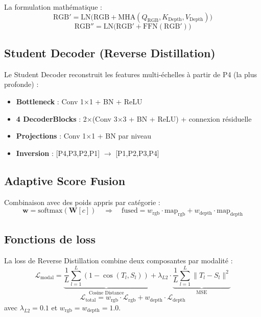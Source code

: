 \documentclass[12pt,a4paper,oneside]{report}
\begin{document}
La formulation mathématique :
\begin{equation}
\text{RGB}' = \text{LN}\big(\text{RGB} + \text{MHA}(Q_{\text{RGB}}, K_{\text{Depth}}, V_{\text{Depth}})\big)
\end{equation}
\begin{equation}
\text{RGB}'' = \text{LN}\big(\text{RGB}' + \text{FFN}(\text{RGB}')\big)
\end{equation}

\subsection{Student Decoder (Reverse Distillation)}

Le Student Decoder reconstruit les features multi-échelles à partir de P4 (la plus profonde) :
\begin{itemize}
    \item \textbf{Bottleneck} : Conv 1$\times$1 + BN + ReLU
    \item \textbf{4 DecoderBlocks} : 2$\times$(Conv 3$\times$3 + BN + ReLU) + connexion résiduelle
    \item \textbf{Projections} : Conv 1$\times$1 + BN par niveau
    \item \textbf{Inversion} : [P4,P3,P2,P1] $\to$ [P1,P2,P3,P4]
\end{itemize}

\subsection{Adaptive Score Fusion}

Combinaison avec des poids appris par catégorie :
\begin{equation}
\mathbf{w} = \text{softmax}(\mathbf{W}[c]) \quad\Rightarrow\quad \text{fused} = w_{\text{rgb}} \cdot \text{map}_{\text{rgb}} + w_{\text{depth}} \cdot \text{map}_{\text{depth}}
\end{equation}

\subsection{Fonctions de loss}

La loss de Reverse Distillation combine deux composantes par modalité :
\begin{equation}
\mathcal{L}_{\text{modal}} = \underbrace{\frac{1}{L}\sum_{l=1}^{L}\left(1 - \cos(T_l, S_l)\right)}_{\text{Cosine Distance}} + \lambda_{L2} \cdot \underbrace{\frac{1}{L}\sum_{l=1}^{L} \|T_l - S_l\|^2}_{\text{MSE}}
\end{equation}
\begin{equation}
\mathcal{L}_{\text{total}} = w_{\text{rgb}} \cdot \mathcal{L}_{\text{rgb}} + w_{\text{depth}} \cdot \mathcal{L}_{\text{depth}}
\end{equation}
avec $\lambda_{L2} = 0.1$ et $w_{\text{rgb}} = w_{\text{depth}} = 1.0$.
\end{document}
